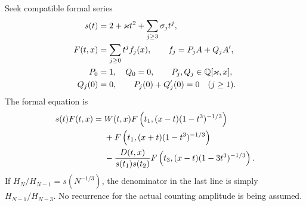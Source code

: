 \documentclass[11pt,letterpaper]{article}
\numberwithin{equation}{section}
\theoremstyle{remark}
\begin{document}
Seek compatible formal series
\begin{align}
 s(t)&=2+\varkappa t^2+\sum_{j\ge3}\sigma_jt^j,\notag\\
 F(t,x)&=\sum_{j\ge0}t^jf_j(x),\qquad
 f_j=P_jA+Q_jA',\label{air:jp:dfa:eq:formalansatz}\\
 P_0&=1,\quad Q_0=0,\qquad P_j,Q_j\in\mathbb Q[\varkappa,x],\notag\\
 Q_j(0)&=0,\qquad P_j(0)+Q_j'(0)=0\quad(j\ge1).\label{air:jp:dfa:eq:gauges}
\end{align}
The formal equation is
\begin{align}
 s(t)F(t,x)={}&W(t,x)F\left(t_1,(x-t)(1-t^3)^{-1/3}\right)\notag\\
 &+F\left(t_1,(x+t)(1-t^3)^{-1/3}\right)\notag\\
 &-\frac{D(t,x)}{s(t_1)s(t_2)}
 F\left(t_3,(x-t)(1-3t^3)^{-1/3}\right).\label{air:jp:dfa:eq:formal}
\end{align}
If $H_N/H_{N-1}=s(N^{-1/3})$, the denominator in the last line is simply $H_{N-1}/H_{N-3}$. No recurrence for the actual counting amplitude is being assumed.
\end{document}
